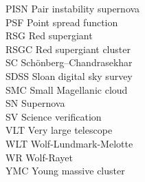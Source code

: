 PISN Pair instability supernova\\
PSF Point spread function\\
RSG Red supergiant\\
RSGC Red supergiant cluster\\
SC Sch\"onberg--Chandrasekhar\\
SDSS Sloan digital sky survey\\
SMC Small Magellanic cloud\\
SN Supernova\\
SV Science verification\\
VLT Very large telescope\\
WLT Wolf-Lundmark-Melotte\\
WR Wolf-Rayet\\
YMC Young massive cluster\\
